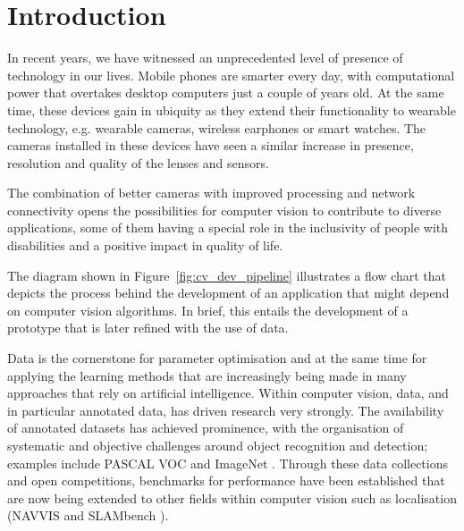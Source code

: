 \chapter{Introduction}\label{ch:introduction}

In recent years, we have witnessed an unprecedented level of presence of technology in our lives. Mobile phones are smarter every day, with computational power that overtakes desktop computers just a couple of years old. At the same time, these devices gain in ubiquity as they extend their functionality to wearable technology, e.g. wearable cameras, wireless earphones or smart watches. The cameras installed in these devices have seen a similar increase in presence, resolution and quality of the lenses and sensors.

The combination of better cameras with improved processing and network connectivity opens the possibilities for computer vision to contribute to diverse applications, some of them having a special role in the inclusivity of people with disabilities and a positive impact in quality of life.

The diagram shown in Figure~\ref{fig:cv_dev_pipeline} illustrates a flow chart that depicts the process behind the development of an application that might depend on computer vision algorithms. In brief, this entails the development of a prototype that is later refined with the use of data. 

Data is the cornerstone for parameter optimisation and at the same time for applying the learning methods that are increasingly being made in many approaches that rely on artificial intelligence. Within computer vision, data, and in particular annotated data, has driven research very strongly. The availability of annotated datasets has achieved prominence, with the organisation of systematic and objective challenges around object recognition and detection; examples include PASCAL VOC \cite{everingham2010pascal} and ImageNet \citep{Deng2009}. Through these data collections and open competitions, benchmarks for performance have been established that are now being extended to other fields within computer vision such as localisation (NAVVIS \cite{Huitl2012} and SLAMbench \cite{nardi2014introducing}).

